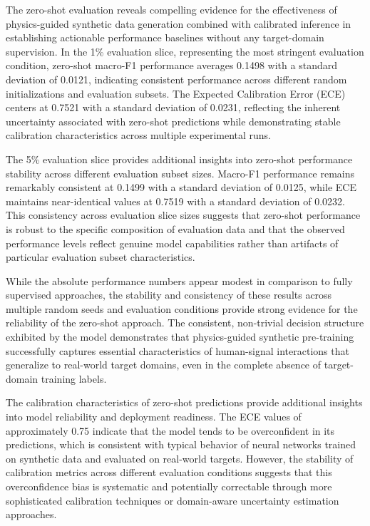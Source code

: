 \documentclass[journal]{IEEEtran}
\begin{document}
The zero-shot evaluation reveals compelling evidence for the effectiveness of physics-guided synthetic data generation combined with calibrated inference in establishing actionable performance baselines without any target-domain supervision. In the 1\% evaluation slice, representing the most stringent evaluation condition, zero-shot macro-F1 performance averages 0.1498 with a standard deviation of 0.0121, indicating consistent performance across different random initializations and evaluation subsets. The Expected Calibration Error (ECE) centers at 0.7521 with a standard deviation of 0.0231, reflecting the inherent uncertainty associated with zero-shot predictions while demonstrating stable calibration characteristics across multiple experimental runs.

The 5\% evaluation slice provides additional insights into zero-shot performance stability across different evaluation subset sizes. Macro-F1 performance remains remarkably consistent at 0.1499 with a standard deviation of 0.0125, while ECE maintains near-identical values at 0.7519 with a standard deviation of 0.0232. This consistency across evaluation slice sizes suggests that zero-shot performance is robust to the specific composition of evaluation data and that the observed performance levels reflect genuine model capabilities rather than artifacts of particular evaluation subset characteristics.

While the absolute performance numbers appear modest in comparison to fully supervised approaches, the stability and consistency of these results across multiple random seeds and evaluation conditions provide strong evidence for the reliability of the zero-shot approach. The consistent, non-trivial decision structure exhibited by the model demonstrates that physics-guided synthetic pre-training successfully captures essential characteristics of human-signal interactions that generalize to real-world target domains, even in the complete absence of target-domain training labels.

The calibration characteristics of zero-shot predictions provide additional insights into model reliability and deployment readiness. The ECE values of approximately 0.75 indicate that the model tends to be overconfident in its predictions, which is consistent with typical behavior of neural networks trained on synthetic data and evaluated on real-world targets. However, the stability of calibration metrics across different evaluation conditions suggests that this overconfidence bias is systematic and potentially correctable through more sophisticated calibration techniques or domain-aware uncertainty estimation approaches.
\end{document}
